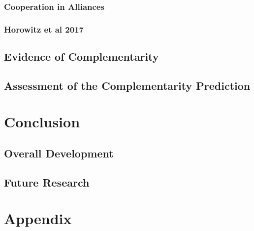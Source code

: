 \documentclass[12pt]{article}
\begin{document}
\subsubsection{Cooperation in Alliances} 



\subsubsection{Horowitz et al 2017} 




\subsection{Evidence of Complementarity} 





\subsection{Assessment of the Complementarity Prediction} 






\section{Conclusion}



\subsection{Overall Development}








\subsection{Future Research}






\section*{Appendix}
\end{document}
